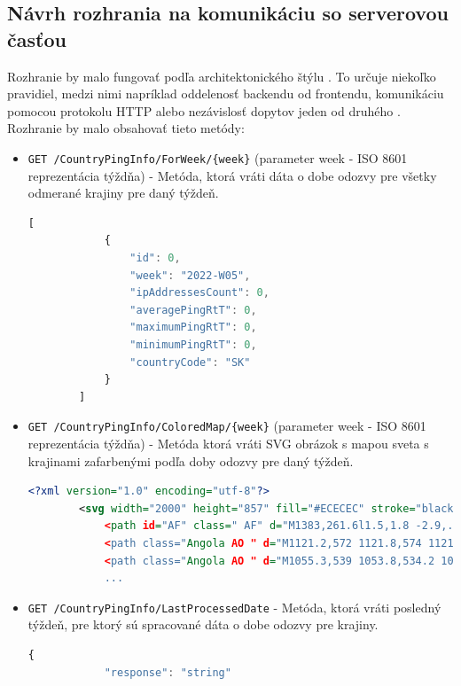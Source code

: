 \subsection{Návrh rozhrania na komunikáciu so serverovou časťou}
Rozhranie by malo fungovať podľa architektonického štýlu . To určuje niekoľko pravidiel, medzi nimi napríklad oddelenosť backendu od frontendu, 
komunikáciu pomocou protokolu HTTP alebo nezávislosť dopytov jeden od druhého \cite{rest}. Rozhranie by malo obsahovať tieto metódy:
\begin{itemize}
    \item \verb|GET /CountryPingInfo/ForWeek/{week}| (parameter week - ISO 8601 reprezentácia týždňa) - Metóda, ktorá vráti dáta o dobe odozvy pre všetky odmerané krajiny pre daný týždeň. 
    \begin{lstlisting}[language={TypeScript},caption={Vzorový výstup z endpointu},label=alg:get_country_ping_info_example]
        [
            {
                "id": 0,
                "week": "2022-W05",
                "ipAddressesCount": 0,
                "averagePingRtT": 0,
                "maximumPingRtT": 0,
                "minimumPingRtT": 0,
                "countryCode": "SK"
            }
        ]
    \end{lstlisting}
    \item \verb|GET /CountryPingInfo/ColoredMap/{week}| (parameter week - ISO 8601 reprezentácia týždňa) - Metóda ktorá vráti SVG obrázok s mapou sveta s krajinami zafarbenými podľa doby odozvy pre daný týždeň. 
    \begin{lstlisting}[language={XML},caption={Vzorový výstup z endpointu},label=alg:get_country_ping_info_map_example]
        <?xml version="1.0" encoding="utf-8"?>
        <svg width="2000" height="857" fill="#ECECEC" stroke="black" stroke-width=".2"...
            <path id="AF" class=" AF" d="M1383,261.6l1.5,1.8 -2.9,.8 -2.4,1.1 -5.9,.8 -5.3,1.3 ...
            <path class="Angola AO " d="M1121.2,572 1121.8,574 1121.1,577.1 1122,580.1 1121.1, ...
            <path class="Angola AO " d="M1055.3,539 1053.8,534.2 1056.1,531.4 1057.8,530.3 ...
            ...
    \end{lstlisting}
    \item \verb|GET /CountryPingInfo/LastProcessedDate| - Metóda, ktorá vráti posledný týždeň, pre ktorý sú spracované dáta o dobe odozvy pre krajiny.
    \begin{lstlisting}[language={TypeScript},caption={Vzorový výstup z endpointu},label=alg:last_date_example]
        {
            "response": "string"

\end{lstlisting}
\end{itemize}
